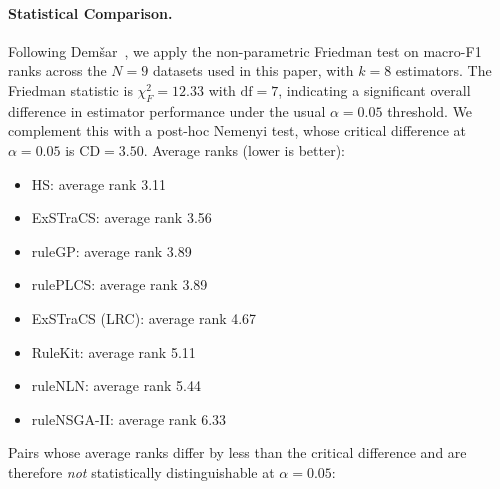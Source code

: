 \paragraph{Statistical Comparison.} Following Dem\v{s}ar~\cite{demsar2006}, we apply the non-parametric Friedman test on macro-F1 ranks across the $N = 9$ datasets used in this paper, with $k = 8$ estimators. The Friedman statistic is $\chi^2_F = 12.33$ with $\mathrm{df} = 7$, indicating a significant overall difference in estimator performance under the usual $\alpha = 0.05$ threshold. We complement this with a post-hoc Nemenyi test, whose critical difference at $\alpha = 0.05$ is $\mathrm{CD} = 3.50$. Average ranks (lower is better):
\begin{itemize}[nosep]
  \item HS: average rank 3.11
  \item ExSTraCS: average rank 3.56
  \item ruleGP: average rank 3.89
  \item rulePLCS: average rank 3.89
  \item ExSTraCS (LRC): average rank 4.67
  \item RuleKit: average rank 5.11
  \item ruleNLN: average rank 5.44
  \item ruleNSGA-II: average rank 6.33
\end{itemize}
Pairs whose average ranks differ by less than the critical difference and are therefore \emph{not} statistically distinguishable at $\alpha = 0.05$:
